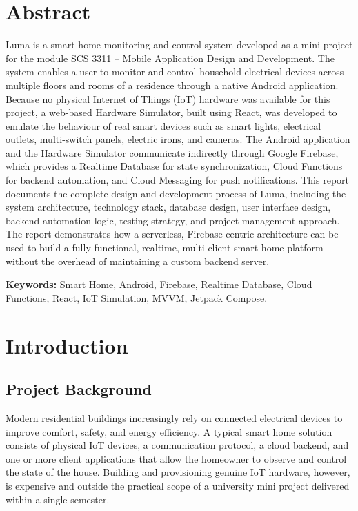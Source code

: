 \documentclass[11pt,a4paper]{article}
\begin{document}
\newpage
\section*{Abstract}
Luma is a smart home monitoring and control system developed as a mini project for the module SCS 3311 -- Mobile Application Design and Development. The system enables a user to monitor and control household electrical devices across multiple floors and rooms of a residence through a native Android application. Because no physical Internet of Things (IoT) hardware was available for this project, a web-based Hardware Simulator, built using React, was developed to emulate the behaviour of real smart devices such as smart lights, electrical outlets, multi-switch panels, electric irons, and cameras. The Android application and the Hardware Simulator communicate indirectly through Google Firebase, which provides a Realtime Database for state synchronization, Cloud Functions for backend automation, and Cloud Messaging for push notifications. This report documents the complete design and development process of Luma, including the system architecture, technology stack, database design, user interface design, backend automation logic, testing strategy, and project management approach. The report demonstrates how a serverless, Firebase-centric architecture can be used to build a fully functional, realtime, multi-client smart home platform without the overhead of maintaining a custom backend server.

\vspace{0.4cm}
\noindent\textbf{Keywords:} Smart Home, Android, Firebase, Realtime Database, Cloud Functions, React, IoT Simulation, MVVM, Jetpack Compose.

\newpage
\tableofcontents
\newpage
\listoffigures
\newpage
\listoftables
\newpage

\section{Introduction}

\subsection{Project Background}
Modern residential buildings increasingly rely on connected electrical devices to improve comfort, safety, and energy efficiency. A typical smart home solution consists of physical IoT devices, a communication protocol, a cloud backend, and one or more client applications that allow the homeowner to observe and control the state of the house. Building and provisioning genuine IoT hardware, however, is expensive and outside the practical scope of a university mini project delivered within a single semester.
\end{document}
